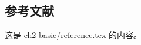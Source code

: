 \begin{ujnreference}
\chapter[参考文献]{参\enspace 考\enspace 文\enspace 献}
这是 ch2-basic/reference.tex 的内容。
\end{ujnreference}
